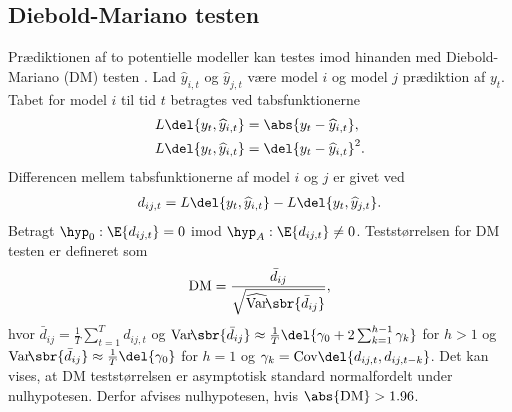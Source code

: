 \subsection{Diebold-Mariano testen}
Prædiktionen af to potentielle modeller kan testes imod hinanden med Diebold-Mariano (DM) testen \citep{dmtest}.
Lad \(\widehat{y}_{i,t}\) og \(\widehat{y}_{j,t}\) være model \(i\) og model \(j\) prædiktion af \(y_{t}\).
Tabet for model \(i\) til tid \(t\) betragtes ved tabsfunktionerne
\begin{align}
L \del{y_t, \widehat{y}_{i,t}} &= \abs{y_t - \widehat{y}_{i,t}}, \label{eq:lossMAE} \\
L \del{y_t, \widehat{y}_{i,t}} &= \del{y_t - \widehat{y}_{i,t}}^2. \label{eq:lossMSE}
\end{align}
Differencen mellem tabsfunktionerne af model \(i\) og \(j\) er givet ved 
\begin{align*}
d_{ij,t} = L \del{y_t, \widehat{y}_{i,t}} - L \del{y_t, \widehat{y}_{j,t}}.
\end{align*}
%
Betragt \(\hyp_0 : \E{d_{ij,t}} = 0\) imod \(\hyp_A: \E{d_{ij,t}} \neq 0\). Teststørrelsen for DM testen er defineret som
\begin{align*}
\text{DM} = \frac{\bar{d}_{ij}}{\sqrt{\widehat{\mathrm{Var}}\!\sbr{\bar{d}_{ij}}}},
\end{align*}
hvor \(\bar{d}_{ij} = \frac{1}{T} \sum_{t = 1}^T d_{ij,t}\) og 
\(\mathrm{Var}\!\sbr{\bar{d}_{ij}} \approx \frac{1}{T} \del{\gamma_0 + 2 \sum_{k=1}^{h-1} \gamma_k}\) for \(h > 1 \) og \(\mathrm{Var}\!\sbr{\bar{d}_{ij}} \approx \frac{1}{T} \del{\gamma_0}\) for \(h = 1\) og \(\gamma_k = \text{Cov} \del{d_{ij,t}, d_{ij,t-k}}\). 
%
Det kan vises, at DM teststørrelsen er asymptotisk standard normalfordelt under nulhypotesen. Derfor afvises nulhypotesen, hvis $\abs{\text{DM}} > 1.96$.